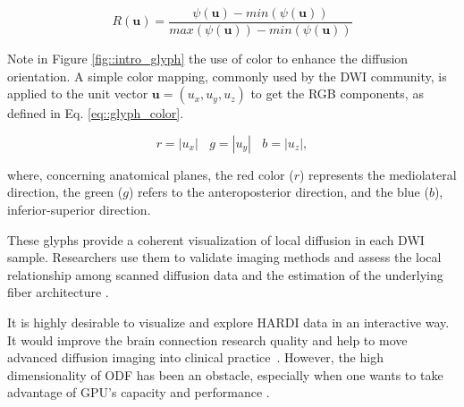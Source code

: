 \documentclass[twoside,twocolumn,10pt]{article}
\begin{document}

\begin{equation}
\label{eq::normglifo}
    R(\bm{u}) = \frac{\psi(\bm{u}) - min(\psi(\bm{u}))}{max(\psi(\bm{u})) - min(\psi(\bm{u}))}
\end{equation}

Note in Figure \ref{fig::intro_glyph} the use of color to enhance the diffusion orientation. A simple color mapping, commonly used by the DWI community, is applied to the unit vector  $\bm{u} = (u_x, u_y, u_z)$ to get the RGB components, as defined in Eq. \ref{eq::glyph_color}.

\begin{equation}
\label{eq::glyph_color}
    r = |u_x| ~~~~ g = |u_y| ~~~~ b = |u_z|, 
\end{equation}

where, concerning anatomical planes, the red color ($r$) represents the mediolateral direction, the green ($g$) refers to the anteroposterior direction, and the blue ($b$), inferior-superior direction.


These glyphs provide a coherent visualization of local diffusion in each DWI sample. Researchers use them to validate imaging methods \cite{descoteaux2007_QBI,  TuchQBall2004,tournier2007,Tournier2004DirectEO, tuch2002,  yeh2010} and assess the local relationship among scanned diffusion data and the estimation of the underlying fiber architecture \cite{cho2008, daducci2014,descoteaux2007, vega2009,Vaillancourt2015}. %

It is highly desirable to visualize and explore HARDI data in an interactive way. It would improve the brain connection research quality and help to move advanced diffusion imaging into clinical practice~\cite{Shapey2019}. However, the high dimensionality of ODF has been an obstacle, especially when one wants to take advantage of GPU's capacity and performance \cite{peeters2009}.
\end{document}
